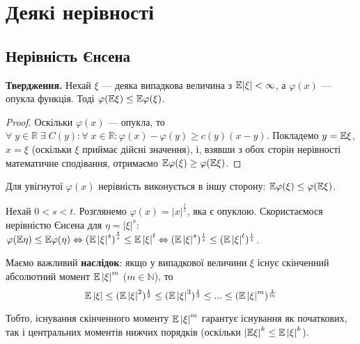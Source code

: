 \section{Деякі нерівності}
\subsection{Нерівність Єнсена}

\noindent\textbf{Твердження.} Нехай $\xi$ --- деяка випадкова величина
з $\mathbb{E}|\xi| < \infty$, а $\varphi(x)$ --- опукла функція. Тоді $\varphi(\mathbb{E}\xi) \leq \mathbb{E}\varphi(\xi)$.
\begin{proof}
    Оскільки $\varphi(x)$ --- опукла, то $\forall \; y \in \mathbb{R} \;\exists \; C(y): \forall \; x \in \mathbb{R}: \varphi(x) - \varphi(y) \geq c(y)(x-y)$.
    Покладемо $y = \mathbb{E}\xi$, $x = \xi$ (оскільки $\xi$ приймає дійсні значення), і, взявши з обох сторін нерівності математичне сподівання,
    отримаємо $\mathbb{E}\varphi(\xi) \geq \varphi(\mathbb{E}\xi)$. 
\end{proof}
\begin{remark}
    Для увігнутої $\varphi(x)$ нерівність виконується в іншу сторону: $\mathbb{E}\varphi(\xi) \leq \varphi(\mathbb{E}\xi)$.
\end{remark}
\begin{example}
    Нехай $0 < s < t$. Розглянемо $\varphi(x) = |x|^{\frac{t}{s}}$, яка є опуклою. Скористаємося нерівністю
    Єнсена для $\eta = \left| \xi\right|^s$:
    $\varphi(\mathbb{E}\eta) \leq \mathbb{E}\varphi(\eta) \Leftrightarrow \left( \mathbb{E} \left| \xi\right|^s\right)^{\frac{t}{s}} \leq \mathbb{E} \left| \xi\right|^t 
    \Leftrightarrow ( \mathbb{E} \left| \xi\right|^s)^{\frac{1}{s}} \leq ( \mathbb{E} \left| \xi\right|^t)^{\frac{1}{t}}$.

    Маємо важливий \textbf{наслідок}: якщо у випадкової величини $\xi$ існує скінченний абсолютний момент $\mathbb{E}\left|\xi\right|^m$ ($m\in \mathbb{N}$), то
    $$\mathbb{E} \left| \xi\right| \leq (\mathbb{E} \left| \xi\right|^2)^{\frac{1}{2}} \leq (\mathbb{E} \left| \xi\right|^3)^{\frac{1}{3}} \leq ... \leq ( \mathbb{E} \left| \xi\right|^m)^{\frac{1}{m}}$$

    Тобто, існування скінченного моменту $\mathbb{E}\left|\xi\right|^m$ гарантує існування як початкових, так і центральних моментів нижчих порядків
    (оскільки $\left| \mathbb{E}\xi \right|^k \leq \mathbb{E}\left|\xi\right|^k$).
\end{example}

